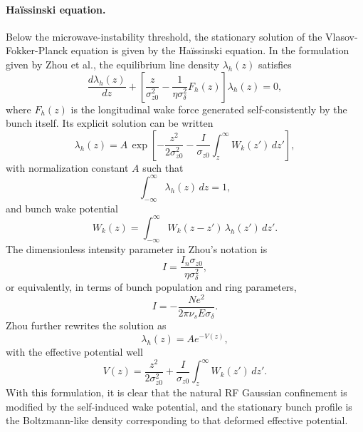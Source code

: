 \documentclass[11pt,a4paper]{article}
\begin{document}
\begin{sloppypar}
\paragraph{Ha\"issinski equation.}
Below the microwave-instability threshold, the stationary solution of the Vlasov-Fokker-Planck equation is given by the Ha\"issinski equation. In the formulation given by Zhou et al., the equilibrium line density $\lambda_h(z)$ satisfies
\begin{equation}
\frac{d\lambda_h(z)}{dz}
+
\left[
\frac{z}{\sigma_{z0}^2}
-
\frac{1}{\eta\sigma_\delta^2}F_h(z)
\right]
\lambda_h(z)
=
0,
\label{eq:haissinski_diff}
\end{equation}
where $F_h(z)$ is the longitudinal wake force generated self-consistently by the bunch itself. Its explicit solution can be written
\begin{equation}
\lambda_h(z)
=
A\,
\exp\!\left[
-\frac{z^2}{2\sigma_{z0}^2}
-
\frac{I}{\sigma_{z0}}
\int_z^\infty W_k(z')\,dz'
\right],
\label{eq:haissinski_sol}
\end{equation}
with normalization constant $A$ such that
\begin{equation}
\int_{-\infty}^{\infty}\lambda_h(z)\,dz=1,
\end{equation}
and bunch wake potential
\begin{equation}
W_k(z)
=
\int_{-\infty}^{\infty}
W_k(z-z')\,\lambda_h(z')\,dz'.
\label{eq:wake_potential_self}
\end{equation}
The dimensionless intensity parameter in Zhou’s notation is
\begin{equation}
I=\frac{I_n\sigma_{z0}}{\eta\sigma_\delta^2},
\end{equation}
or equivalently, in terms of bunch population and ring parameters,
\begin{equation}
I=-\frac{Ne^2}{2\pi\nu_s E\sigma_\delta}.
\end{equation}
Zhou further rewrites the solution as
\begin{equation}
\lambda_h(z)=A e^{-V(z)},
\end{equation}
with the effective potential well
\begin{equation}
V(z)
=
\frac{z^2}{2\sigma_{z0}^2}
+
\frac{I}{\sigma_{z0}}
\int_z^\infty W_k(z')\,dz'.
\label{eq:effective_potential}
\end{equation}
With this formulation, it is clear that the natural RF Gaussian confinement is modified by the self-induced wake potential, and the stationary bunch profile is the Boltzmann-like density corresponding to that deformed effective potential. 


\end{sloppypar}
\end{document}
